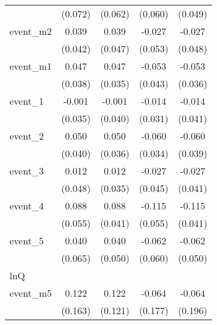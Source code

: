 {\begin{tabular}{l*{4}{c}}
            &     (0.072)         &     (0.062)         &     (0.060)         &     (0.049)         \\
[1em]
event\_m2    &       0.039         &       0.039         &      -0.027         &      -0.027         \\
            &     (0.042)         &     (0.047)         &     (0.053)         &     (0.048)         \\
[1em]
event\_m1    &       0.047         &       0.047         &      -0.053         &      -0.053         \\
            &     (0.038)         &     (0.035)         &     (0.043)         &     (0.036)         \\
[1em]
event\_1     &      -0.001         &      -0.001         &      -0.014         &      -0.014         \\
            &     (0.035)         &     (0.040)         &     (0.031)         &     (0.041)         \\
[1em]
event\_2     &       0.050         &       0.050         &      -0.060         &      -0.060         \\
            &     (0.040)         &     (0.036)         &     (0.034)         &     (0.039)         \\
[1em]
event\_3     &       0.012         &       0.012         &      -0.027         &      -0.027         \\
            &     (0.048)         &     (0.035)         &     (0.045)         &     (0.041)         \\
[1em]
event\_4     &       0.088         &       0.088\sym{*}  &      -0.115\sym{*}  &      -0.115\sym{**} \\
            &     (0.055)         &     (0.041)         &     (0.055)         &     (0.041)         \\
[1em]
event\_5     &       0.040         &       0.040         &      -0.062         &      -0.062         \\
            &     (0.065)         &     (0.050)         &     (0.060)         &     (0.050)         \\
\hline
lnQ         &                     &                     &                     &                     \\
event\_m5    &       0.122         &       0.122         &      -0.064         &      -0.064         \\
            &     (0.163)         &     (0.121)         &     (0.177)         &     (0.196)         \\

\end{tabular}}
